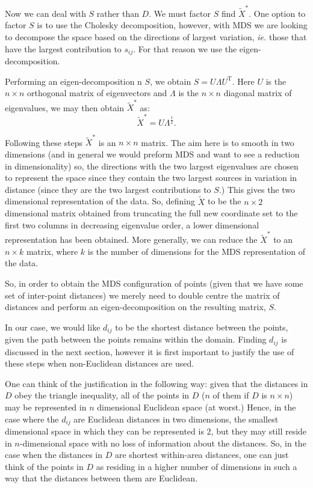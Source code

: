 \documentclass[a4paper,10pt]{article}
\newcommand{\tr}[1]{#1^{\text{T}}}
\newcommand{\cross}{\times}
\begin{document}
Now we can deal with $S$ rather than $D$. We must factor $S$ find $\tilde{X}^{*}$. One option to factor $S$ is to use the Cholesky decomposition, however, with MDS we are looking to decompose the space based on the directions of largest variation, \emph{ie.} those that have the largest contribution to $s_{ij}$. For that reason we use the eigen-decomposition.

Performing an eigen-decomposition n $S$, we obtain $S=U\Lambda\tr{U}$. Here $U$ is the $n \cross n$ orthogonal matrix of eigenvectors and $\Lambda$ is the $n \cross n$ diagonal matrix of eigenvalues, we may then obtain $\tilde{X}^*$ as:
\begin{equation}
\tilde{X}^*=U\Lambda^{\frac{1}{2}}.
\end{equation}

Following these steps $\tilde{X}^*$ is an $n \cross n$ matrix. The aim here is to smooth in two dimensions (and in general we would preform MDS and want to see a reduction in dimensionality) so, the directions with the two largest eigenvalues are chosen to represent the space since they contain the two largest sources in variation in distance (since they are the two largest contributions to $S$.) This gives the two dimensional representation of the data. So, defining $\tilde{X}$ to be the $n \cross 2$ dimensional matrix obtained from truncating the full new coordinate set to the first two columns in decreasing eigenvalue order, a lower dimensional representation has been obtained. More generally, we can reduce the $\tilde{X}^*$ to an $n \cross k$ matrix, where $k$ is the number of dimensions for the MDS representation of the data.

So, in order to obtain the MDS configuration of points (given that we have some set of inter-point distances) we merely need to double centre the matrix of distances and perform an eigen-decomposition on the resulting matrix, $S$. 

In our case, we would like $d_{ij}$ to be the shortest distance between the points, given the path between the points remains within the domain. Finding $d_{ij}$ is discussed in the next section, however it is first important to justify the use of these steps when non-Euclidean distances are used. 

One can think of the justification in the following way: given that the distances in $D$ obey the triangle inequality, all of the points in $D$ ($n$ of them if $D$ is $n \cross n$) may be represented in $n$ dimensional Euclidean space (at worst.) Hence, in the case where the $d_{ij}$ are Euclidean distances in two dimensions, the smallest dimensional space in which they can be represented is 2, but they may still reside in $n$-dimensional space with no loss of information about the distances. So, in the case when the distances in $D$ are shortest within-area distances, one can just think of the points in $D$ as residing in a higher number of dimensions in such a way that the distances between them are Euclidean.
\end{document}
